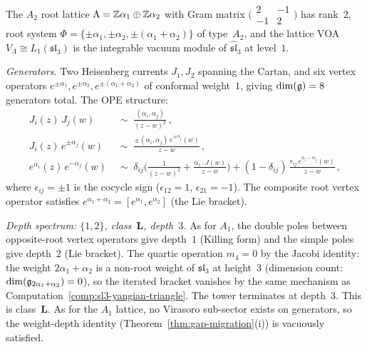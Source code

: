 \begin{computation}%
\label{comp:lattice-voa-A2-ordered-bar}%
%
%
%
The $A_2$ root lattice $\Lambda = \mathbb{Z}\alpha_1 \oplus \mathbb{Z}\alpha_2$
with Gram matrix
$\bigl(\begin{smallmatrix} 2 & -1 \\ -1 & 2
\end{smallmatrix}\bigr)$
has rank~$2$, root system $\Phi = \{\pm\alpha_1, \pm\alpha_2,
\pm(\alpha_1+\alpha_2)\}$ of type~$A_2$, and the lattice VOA
$V_\Lambda \cong L_1(\mathfrak{sl}_3)$ is the integrable vacuum
module of $\widehat{\mathfrak{sl}}_3$ at level~$1$.

\smallskip
\noindent
\emph{Generators.}
Two Heisenberg currents $J_1, J_2$ spanning the Cartan,
and six vertex operators $e^{\pm\alpha_1}, e^{\pm\alpha_2},
e^{\pm(\alpha_1+\alpha_2)}$ of conformal weight~$1$,
giving $\dim(\mathfrak{g}) = 8$ generators total.
The OPE structure:
\begin{align}
J_i(z)\,J_j(w) &\;\sim\; \frac{(\alpha_i,\alpha_j)}{(z-w)^2}\,,
\label{eq:A2-cartan-ope}
\\[3pt]
J_i(z)\,e^{\pm\alpha_j}(w) &\;\sim\;
\frac{\pm(\alpha_i,\alpha_j)\,e^{\pm\alpha_j}(w)}{z-w}\,,
\\[3pt]
e^{\alpha_i}(z)\,e^{-\alpha_j}(w)
&\;\sim\;
\delta_{ij}\biggl(
\frac{1}{(z-w)^2}
+ \frac{\alpha_i \cdot J(w)}{z-w}\biggr)
+ (1-\delta_{ij})\,
\frac{\epsilon_{ij}\,e^{\alpha_i-\alpha_j}(w)}{z-w}\,,
\label{eq:A2-vertex-ope}
\end{align}
where $\epsilon_{ij} = \pm 1$ is the cocycle sign
($\epsilon_{12} = 1$, $\epsilon_{21} = -1$). The composite
root vertex operator satisfies
$e^{\alpha_1+\alpha_2} = [e^{\alpha_1}, e^{\alpha_2}]$
(the Lie bracket).

\smallskip
\noindent
\emph{Depth spectrum: $\{1,2\}$, class~$\mathbf{L}$, depth~$3$.}
As for $A_1$, the double poles between opposite-root vertex
operators give depth~$1$ (Killing form) and the simple poles
give depth~$2$ (Lie bracket). The quartic operation $m_4 = 0$
by the Jacobi identity:
the weight $2\alpha_1 + \alpha_2$ is a non-root weight of
$\mathfrak{sl}_3$ at height~$3$ (dimension count: $\dim(\mathfrak{g}_{2\alpha_1+\alpha_2}) = 0$),
so the iterated bracket vanishes by the same mechanism as
Computation~\ref{comp:sl3-yangian-triangle}.
The tower terminates at depth~$3$. This is class~$\mathbf{L}$.
As for the $A_1$ lattice, no Virasoro sub-sector exists on generators, so the weight-depth identity (Theorem~\ref{thm:gap-migration}(i)) is vacuously satisfied.


\end{computation}
